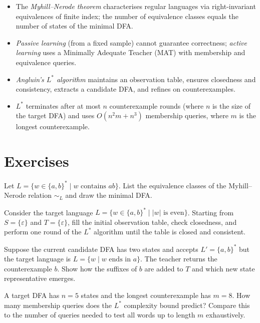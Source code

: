 \begin{summarybox}
\begin{itemize}[nosep]
  \item The \emph{Myhill--Nerode theorem} characterises regular languages
    via right-invariant equivalences of finite index; the number of equivalence
    classes equals the number of states of the minimal DFA.
  \item \emph{Passive learning} (from a fixed sample) cannot guarantee
    correctness; \emph{active learning} uses a Minimally Adequate
    Teacher (MAT) with membership and equivalence queries.
  \item \emph{Angluin's $L^*$ algorithm} maintains an observation table,
    ensures closedness and consistency, extracts a candidate DFA, and
    refines on counterexamples.
  \item $L^*$ terminates after at most $n$ counterexample rounds (where
    $n$ is the size of the target DFA) and uses $O(n^2 m + n^3)$
    membership queries, where $m$ is the longest counterexample.
\end{itemize}
\end{summarybox}

\section*{Exercises}

\begin{chapex}
Let $L = \{w \in \{a,b\}^* \mid w \text{ contains } ab\}$.
List the equivalence classes of the Myhill--Nerode relation $\sim_L$
and draw the minimal DFA.
\end{chapex}

\begin{chapex}
Consider the target language $L = \{w \in \{a,b\}^* \mid |w| \text{ is even}\}$.
Starting from $S = \{\varepsilon\}$ and $T = \{\varepsilon\}$, fill the
initial observation table, check closedness, and perform one round of
the $L^*$ algorithm until the table is closed and consistent.
\end{chapex}

\begin{chapex}
Suppose the current candidate DFA has two states and accepts $L' = \{a,b\}^*$
but the target language is $L = \{w \mid w \text{ ends in } a\}$.
The teacher returns the counterexample $b$.  Show how the suffixes
of $b$ are added to $T$ and which new state representative emerges.
\end{chapex}

\begin{chapex}
A target DFA has $n=5$ states and the longest counterexample has
$m=8$.  How many membership queries does the $L^*$ complexity bound
predict?  Compare this to the number of queries needed to test all
words up to length $m$ exhaustively.
\end{chapex}

